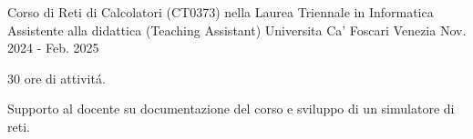 
\begin{cventries}

    \cventry
        {Corso di Reti di Calcolatori (CT0373) nella Laurea Triennale in Informatica} %
        {Assistente alla didattica (Teaching Assistant)} %
        {Universita Ca' Foscari Venezia} %
        {Nov. 2024 - Feb. 2025} %
        {
                \begin{cvitems} %
                        \item {30 ore di attivitá.}
                        \item {Supporto al docente su documentazione del corso e sviluppo di un simulatore di reti.}
                \end{cvitems}
        }
\end{cventries}